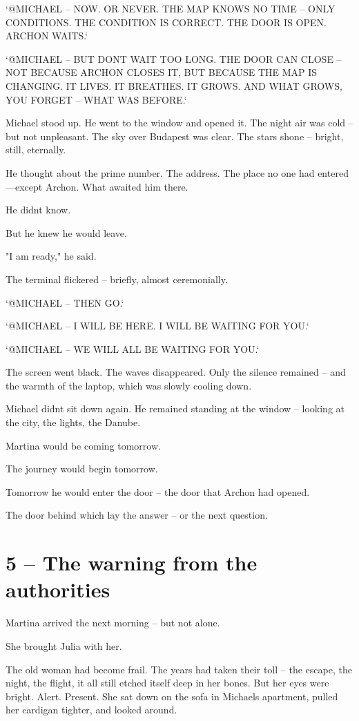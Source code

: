 \documentclass[
]{article}
\begin{document}
`@MICHAEL -- NOW. OR NEVER. THE MAP KNOWS NO TIME -- ONLY CONDITIONS. THE CONDITION IS CORRECT. THE DOOR IS OPEN. ARCHON WAITS.`

`@MICHAEL -- BUT DON\textquotesingle T WAIT TOO LONG. THE DOOR CAN CLOSE -- NOT BECAUSE ARCHON CLOSES IT, BUT BECAUSE THE MAP IS CHANGING. IT LIVES. IT BREATHES. IT GROWS. AND WHAT GROWS, YOU FORGET -- WHAT WAS BEFORE.`

Michael stood up. He went to the window and opened it. The night air was cold -- but not unpleasant. The sky over Budapest was clear. The stars shone -- bright, still, eternally.

He thought about the prime number. The address. The place no one had entered---except Archon. What awaited him there.

He didn\textquotesingle t know.

But he knew he would leave.

"I am ready," he said.

The terminal flickered -- briefly, almost ceremonially.

`@MICHAEL -- THEN GO.`

`@MICHAEL -- I WILL BE HERE. I WILL BE WAITING FOR YOU.`

`@MICHAEL -- WE WILL ALL BE WAITING FOR YOU.`

The screen went black. The waves disappeared. Only the silence remained -- and the warmth of the laptop, which was slowly cooling down.

Michael didn\textquotesingle t sit down again. He remained standing at the window -- looking at the city, the lights, the Danube.

Martina would be coming tomorrow.

The journey would begin tomorrow.

Tomorrow he would enter the door -- the door that Archon had opened.

The door behind which lay the answer -- or the next question.

\section{5 -- The warning from the authorities}\label{the-warning-from-the-authorities}

Martina arrived the next morning -- but not alone.

She brought Julia with her.

The old woman had become frail. The years had taken their toll -- the escape, the night, the flight, it all still etched itself deep in her bones. But her eyes were bright. Alert. Present. She sat down on the sofa in Michael\textquotesingle s apartment, pulled her cardigan tighter, and looked around.
\end{document}
